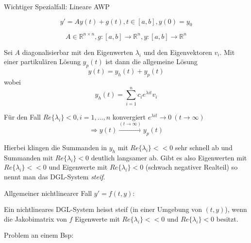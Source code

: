 \documentclass[10pt,a4paper]{article}
\begin{document}



Wichtiger Spezialfall: Lineare AWP

$$y'=Ay(t)+g(t), t \in [a,b], y(0)=y_0$$

$$A \in \mathbb{R}^{n \times n}, g:[a,b] \rightarrow \mathbb{R}^{n}, y: [a,b] \rightarrow \mathbb{R}^{n}$$

Sei $A$ diagonalisierbar mit den Eigenwerten $\lambda_i$ und den Eigenvektoren $v_i$. Mit einer partikulären Lösung $y_p(t)$ ist dann die allgemeine Lösung $$y(t)=y_h(t)+y_p(t)$$ wobei $$y_h(t)=\sum_{i=1}^{n}c_i e^{\lambda i t}v_i$$

Für den Fall $Re\{\lambda_i\}<0, i=1,\ldots,n$ konvergiert $e^{\lambda i t} \rightarrow 0 ~ (t\rightarrow \infty)$ $$ \Rightarrow y(t) \stackrel{(t\rightarrow \infty)}{\rightarrow} y_p(t)$$

Hierbei klingen die Summanden in $y_h$ mit $Re\{\lambda_i\}<<0$ sehr schnell ab und Summanden mit $Re\{\lambda_i\}<0$ deutlich langsamer ab. Gibt es also Eigenwerten mit $Re\{\lambda_i\}<<0$ und Eigenwerte mit $Re\{\lambda_i\}<0$ (schwach negativer Realteil) so nennt man das DGL-System \emph{steif}.

Allgemeiner nichtlinearer Fall $y'=f(t,y)$:

Ein nichtlineares DGL-System heisst steif (in einer Umgebung von $(t,y)$), wenn die Jakobimatrix von $f$ Eigenwerte mit $Re\{\lambda_i\}<<0$ und $Re\{\lambda_i\}<0$ besitzt.

Problem an einem Bsp:
\end{document}
